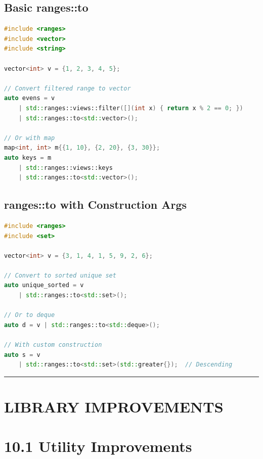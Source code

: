 \hypertarget{basic-rangesto}{%
\subsection{Basic ranges::to}\label{basic-rangesto}}

\begin{lstlisting}[language={C++}]
#include <ranges>
#include <vector>
#include <string>

vector<int> v = {1, 2, 3, 4, 5};

// Convert filtered range to vector
auto evens = v
    | std::ranges::views::filter([](int x) { return x % 2 == 0; })
    | std::ranges::to<std::vector>();

// Or with map
map<int, int> m{{1, 10}, {2, 20}, {3, 30}};
auto keys = m
    | std::ranges::views::keys
    | std::ranges::to<std::vector>();
\end{lstlisting}

\hypertarget{rangesto-with-construction-args}{%
\subsection{ranges::to with Construction
Args}\label{rangesto-with-construction-args}}

\begin{lstlisting}[language={C++}]
#include <ranges>
#include <set>

vector<int> v = {3, 1, 4, 1, 5, 9, 2, 6};

// Convert to sorted unique set
auto unique_sorted = v
    | std::ranges::to<std::set>();

// Or to deque
auto d = v | std::ranges::to<std::deque>();

// With custom construction
auto s = v
    | std::ranges::to<std::set>(std::greater{});  // Descending
\end{lstlisting}

\begin{center}\rule{0.5\linewidth}{0.5pt}\end{center}

\hypertarget{library-improvements}{%
\section{LIBRARY IMPROVEMENTS}\label{library-improvements}}

\hypertarget{utility-improvements}{%
\section{10.1 Utility Improvements}\label{utility-improvements}}

